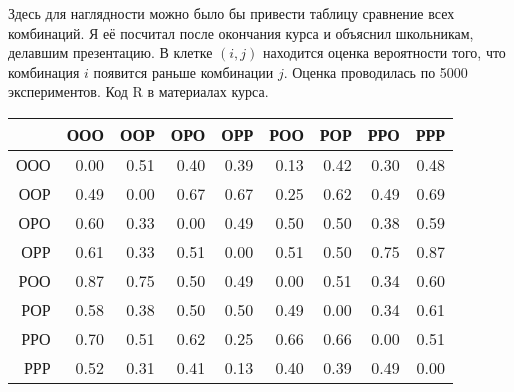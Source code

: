 \documentclass[a4paper, 12pt]{article}
\begin{document}
\begin{enumerate}
Здесь для наглядности можно было бы привести таблицу сравнение всех комбинаций. Я её посчитал после окончания курса и объяснил школьникам, делавшим презентацию. В клетке $(i, j)$ находится оценка вероятности того, что комбинация $i$ появится раньше комбинации $j$. Оценка проводилась по 5000 экспериментов. Код R в материалах курса.

\begin{table}[ht]
\centering
\begin{tabular}{rrrrrrrrr}
  \hline
 & ООО & ООР & ОРО & ОРР & РОО & РОР & РРО & РРР \\
  \hline
ООО & 0.00 & 0.51 & 0.40 & 0.39 & 0.13 & 0.42 & 0.30 & 0.48 \\
ООР & 0.49 & 0.00 & 0.67 & 0.67 & 0.25 & 0.62 & 0.49 & 0.69 \\
ОРО & 0.60 & 0.33 & 0.00 & 0.49 & 0.50 & 0.50 & 0.38 & 0.59 \\
ОРР & 0.61 & 0.33 & 0.51 & 0.00 & 0.51 & 0.50 & 0.75 & 0.87 \\
РОО & 0.87 & 0.75 & 0.50 & 0.49 & 0.00 & 0.51 & 0.34 & 0.60 \\
РОР & 0.58 & 0.38 & 0.50 & 0.50 & 0.49 & 0.00 & 0.34 & 0.61 \\
РРО & 0.70 & 0.51 & 0.62 & 0.25 & 0.66 & 0.66 & 0.00 & 0.51 \\
РРР & 0.52 & 0.31 & 0.41 & 0.13 & 0.40 & 0.39 & 0.49 & 0.00 \\
   \hline
\end{tabular}
\end{table}



\end{enumerate}
\end{document}
